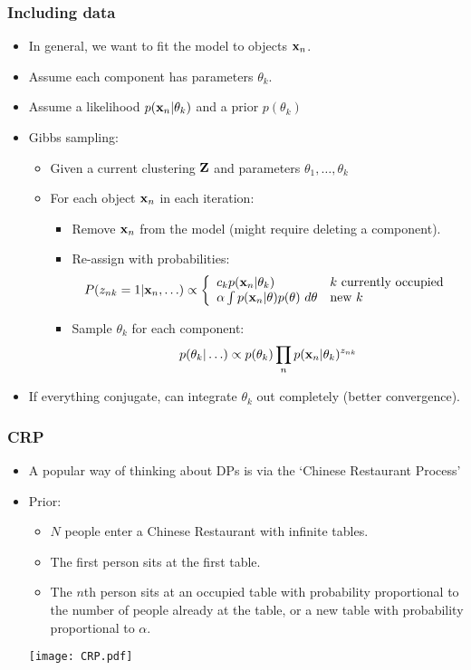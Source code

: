 \begin{frame}
	\frametitle{Including data}
	\begin{itemize}
		\item In general, we want to fit the model to objects $\mathbf{x}_n$.
		\item Assume each component has parameters $\theta_k$.
		\item Assume a likelihood $p(\mathbf{x}_n|\theta_k)$ and a prior $p(\theta_k)$
		\item<2->Gibbs sampling:
		\begin{itemize}
			\item Given a current clustering $\mathbf{Z}$ and parameters $\theta_1,\ldots,\theta_k$
			\item For each object $\mathbf{x}_n$ in each iteration:
			\begin{itemize}
				\item Remove $\mathbf{x}_n$ from the model (might require deleting a component).
				\item Re-assign with probabilities:
				\[
					P(z_{nk}=1|\mathbf{x}_n,\ldots)\propto \left\{\begin{array}{ll}
						c_k p(\mathbf{x}_n|\theta_k) & \mbox{$k$ currently occupied}\\
						\alpha \int p(\mathbf{x}_n|\theta)p(\theta)~d\theta & \mbox{new $k$}
					\end{array}\right.
				\]
				\item Sample $\theta_k$ for each component:
				\[
				p(\theta_k|\ldots)\propto p(\theta_k)\prod_n p(\mathbf{x}_n|\theta_k)^{z_{nk}}
				\]
			\end{itemize}
		\end{itemize}
		\item<3->If everything conjugate, can integrate $\theta_k$ out completely (better convergence).
	\end{itemize}
\end{frame}
\begin{frame}
	\frametitle{\ac{CRP}}
	\begin{itemize}
		\item A popular way of thinking about DPs is via the `Chinese Restaurant Process'
		\item Prior:
		\begin{itemize}
			\item $N$ people enter a Chinese Restaurant with infinite tables.
			\item The first person sits at the first table.
			\item The $n$th person sits at an occupied table with probability proportional to the number of people already at the table, or a new table with probability proportional to $\alpha$.
		\end{itemize}
		\texttt{[image: CRP.pdf]}		
	\end{itemize}
\end{frame}

